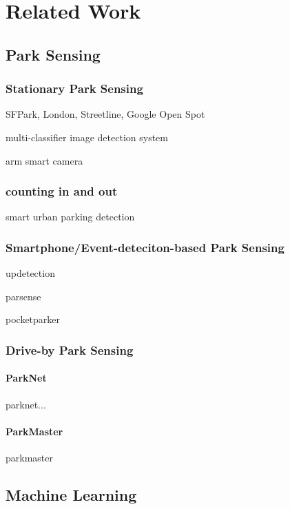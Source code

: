 \chapter{Related Work}
\label{chap:relatedwork}

\section{Park Sensing}

\subsection{Stationary Park Sensing}

SFPark, London, Streetline, Google Open Spot

multi-classifier image detection system\cite{stationary_camera_sensing}

arm smart camera \cite{stationary_camera_sensing_arm_smart_camera}

\subsection{counting in and out}
smart urban parking detection \cite{smarturbanparkingdetection}

\subsection{Smartphone/Event-deteciton-based Park Sensing}


updetection\cite{Ma:2014:USP:2674918.2674929}

parsense \cite{Nawaz:2013:PSB:2500423.2500438}

pocketparker \cite{Nandugudi:2014:PPP:2632048.2632098}


\subsection{Drive-by Park Sensing}

\subsubsection{ParkNet}
\label{sec:parknet}

parknet... \cite{Mathur:2010:PDS:1814433.1814448}

\subsubsection{ParkMaster}
 
parkmaster \cite{Grassi:2017:PIE:3132211.3134452}






\section{Machine Learning}

